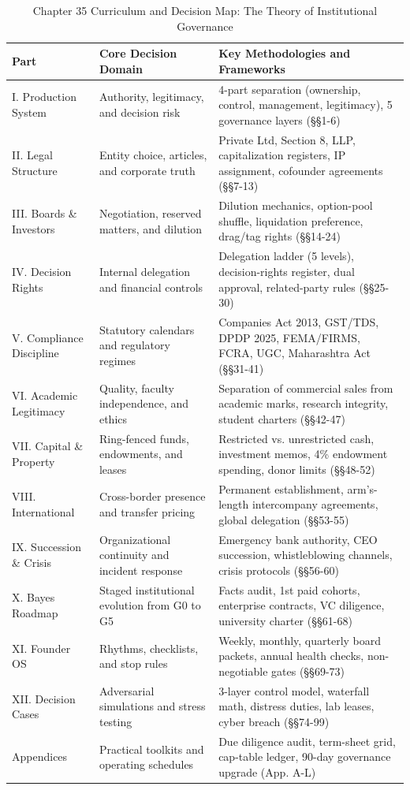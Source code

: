 \begin{table}[t]
\centering
\small
\caption{Chapter 35 Curriculum and Decision Map: The Theory of Institutional Governance}
\label{tab:ch35_reading_map}
\begin{tabularx}{\textwidth}{p{3.2cm} p{5.5cm} X}
\toprule
\textbf{Part} & \textbf{Core Decision Domain} & \textbf{Key Methodologies and Frameworks} \\
\midrule
I. Production System & Authority, legitimacy, and decision risk & 4-part separation (ownership, control, management, legitimacy), 5 governance layers (§§1-6) \\
II. Legal Structure & Entity choice, articles, and corporate truth & Private Ltd, Section 8, LLP, capitalization registers, IP assignment, cofounder agreements (§§7-13) \\
III. Boards \& Investors & Negotiation, reserved matters, and dilution & Dilution mechanics, option-pool shuffle, liquidation preference, drag/tag rights (§§14-24) \\
IV. Decision Rights & Internal delegation and financial controls & Delegation ladder (5 levels), decision-rights register, dual approval, related-party rules (§§25-30) \\
V. Compliance Discipline & Statutory calendars and regulatory regimes & Companies Act 2013, GST/TDS, DPDP 2025, FEMA/FIRMS, FCRA, UGC, Maharashtra Act (§§31-41) \\
VI. Academic Legitimacy & Quality, faculty independence, and ethics & Separation of commercial sales from academic marks, research integrity, student charters (§§42-47) \\
VII. Capital \& Property & Ring-fenced funds, endowments, and leases & Restricted vs. unrestricted cash, investment memos, 4\% endowment spending, donor limits (§§48-52) \\
VIII. International & Cross-border presence and transfer pricing & Permanent establishment, arm's-length intercompany agreements, global delegation (§§53-55) \\
IX. Succession \& Crisis & Organizational continuity and incident response & Emergency bank authority, CEO succession, whistleblowing channels, crisis protocols (§§56-60) \\
X. Bayes Roadmap & Staged institutional evolution from G0 to G5 & Facts audit, 1st paid cohorts, enterprise contracts, VC diligence, university charter (§§61-68) \\
XI. Founder OS & Rhythms, checklists, and stop rules & Weekly, monthly, quarterly board packets, annual health checks, non-negotiable gates (§§69-73) \\
XII. Decision Cases & Adversarial simulations and stress testing & 3-layer control model, waterfall math, distress duties, lab leases, cyber breach (§§74-99) \\
Appendices & Practical toolkits and operating schedules & Due diligence audit, term-sheet grid, cap-table ledger, 90-day governance upgrade (App. A-L) \\
\bottomrule
\end{tabularx}
\end{table}

